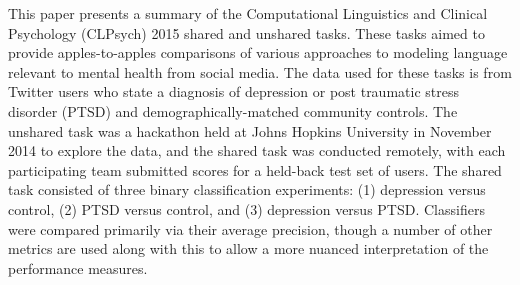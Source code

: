 This paper presents a summary of the Computational Linguistics and Clinical Psychology (CLPsych) 2015 shared and unshared tasks. These tasks aimed to provide apples-to-apples comparisons of  various approaches to modeling language relevant to mental health from social media. The data used for these tasks is from Twitter users  who state a diagnosis of depression or post traumatic stress disorder (PTSD) and demographically-matched community controls.  The unshared task was a hackathon held at Johns Hopkins University in November 2014 to explore the data, and the shared task was conducted remotely, with each participating team submitted scores for  a held-back test set of users.  The shared task consisted of three binary classification experiments: (1) depression versus control, (2) PTSD versus control, and (3) depression versus PTSD. Classifiers were compared primarily via their average precision, though a number of other metrics are used along with this to allow a more nuanced interpretation of the performance measures.
